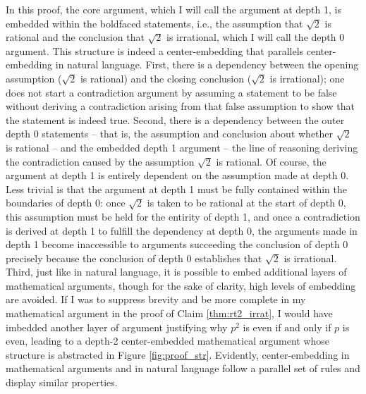\documentclass[12pt, letterpaper]{article}
\begin{document}
In this proof, the core argument, which I will call the argument at depth 1, is embedded within the boldfaced statements, 
i.e., the assumption that $\sqrt{2}$ is rational and the conclusion that $\sqrt{2}$ is irrational, which I will call the depth 0 argument.  
This structure is indeed a center-embedding that parallels center-embedding in natural language. 
First, there is a dependency between the opening assumption ($\sqrt{2}$ is rational) and the closing conclusion ($\sqrt{2}$ is irrational);
one does not start a contradiction argument by assuming a statement to be false without deriving a contradiction arising from that false assumption to show that the statement is indeed true. 
Second, there is a dependency between the outer depth 0 statements -- that is, the assumption and conclusion about whether $\sqrt{2}$ is rational -- and the embedded depth 1 argument -- the line of reasoning deriving the contradiction caused by the assumption $\sqrt{2}$ is rational. 
Of course, the argument at depth 1 is entirely dependent on the assumption made at depth 0. 
Less trivial is that the argument at depth 1 must be fully contained within the boundaries of depth 0: 
once $\sqrt{2}$ is taken to be rational at the start of depth 0, this assumption must be held for the entirity of depth 1, and once a contradiction is derived at depth 1 to fulfill the dependency at depth 0, the arguments made in depth 1 become inaccessible to arguments succeeding the conclusion of depth 0 precisely because the conclusion of depth 0 establishes that $\sqrt{2}$ is irrational.  
Third, just like in natural language, it is possible to embed additional layers of mathematical arguments, though for the sake of clarity, high levels of embedding are avoided. 
If I was to suppress brevity and be more complete in my mathematical argument in the proof of Claim \ref{thm:rt2_irrat}, I would have imbedded another layer of argument justifying why $p^2$ is even if and only if $p$ is even, leading to a depth-2 center-embedded mathematical argument whose structure is abstracted in Figure \ref{fig:proof_str}. 
Evidently, center-embedding in mathematical arguments and in natural language follow a parallel set of rules and display similar properties. 
\end{document}
